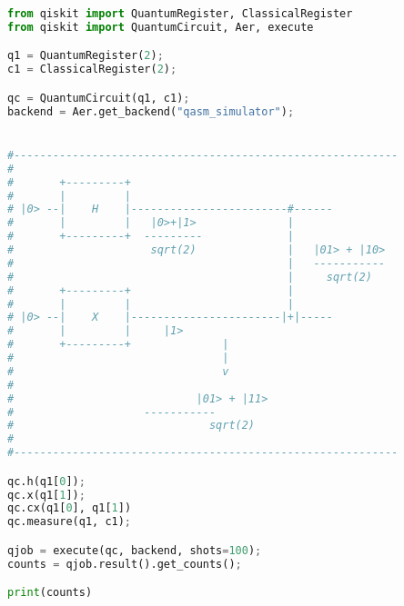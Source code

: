 \documentclass{article}
\begin{document}
\begin{lstlisting}[language=python]
from qiskit import QuantumRegister, ClassicalRegister
from qiskit import QuantumCircuit, Aer, execute

q1 = QuantumRegister(2);
c1 = ClassicalRegister(2);

qc = QuantumCircuit(q1, c1);
backend = Aer.get_backend("qasm_simulator");


#-----------------------------------------------------------
#
#       +---------+                                         
#       |         |                                         
# |0> --|    H    |------------------------#------
#       |         |   |0>+|1>              |               
#       +---------+  ---------             |     
#                     sqrt(2)              |   |01> + |10>    
#                                          |   ----------- 
#                                          |     sqrt(2)   
#       +---------+                        |    
#       |         |                        |    
# |0> --|    X    |-----------------------|+|-----
#       |         |     |1>                    
#       +---------+              |                   
#                                |                    
#                                v                  
#                                                              
#                            |01> + |11>                     
#       		     -----------
#                              sqrt(2)              
#
#-----------------------------------------------------------

qc.h(q1[0]);
qc.x(q1[1]);
qc.cx(q1[0], q1[1])
qc.measure(q1, c1);

qjob = execute(qc, backend, shots=100);
counts = qjob.result().get_counts();

print(counts)
\end{lstlisting}
\end{document}
